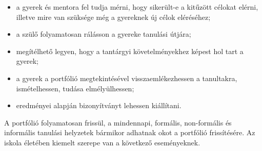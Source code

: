 \begin{itemize}
      \item a gyerek és mentora fel tudja mérni, hogy sikerült-e a kitűzött
            célokat
            elérni, illetve mire van szüksége még a gyereknek új célok
            eléréséhez;

      \item a szülő folyamatosan rálásson a gyereke tanulási útjára;

      \item megítélhető legyen, hogy a tantárgyi követelményekhez
            képest
            hol
            tart a gyerek;

      \item a gyerek a portfólió megtekintésével visszaemlékezhessen a
            tanultakra,
            ismételhessen, tudása elmélyülhessen;

      \item eredményei alapján bizonyítványt lehessen kiállítani.

\end{itemize}

A portfólió folyamatosan frissül, a mindennapi, formális, non-formális és
informális tanulási helyzetek
bármikor adhatnak okot a portfólió frissítésére. Az iskola életében kiemelt
szerepe van a következő eseményeknek.


